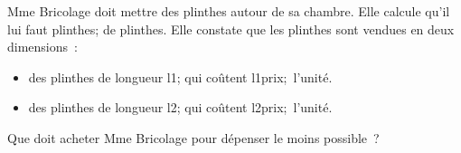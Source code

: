 \documentclass[exercice]{thedocument}%
\begin{document}
%
Mme Bricolage doit mettre des plinthes autour de sa chambre. Elle calcule
qu'il lui faut \<plinthes; de plinthes. Elle constate que les plinthes sont
vendues en deux dimensions~:
\begin{itemize}
    \item des plinthes de longueur \<l1; qui coûtent \<l1prix;\ l'unité.
    \item des plinthes de longueur \<l2; qui coûtent \<l2prix;\ l'unité.
\end{itemize}
Que doit acheter Mme Bricolage pour dépenser le moins possible~?\vskip10pt
\end{document}
